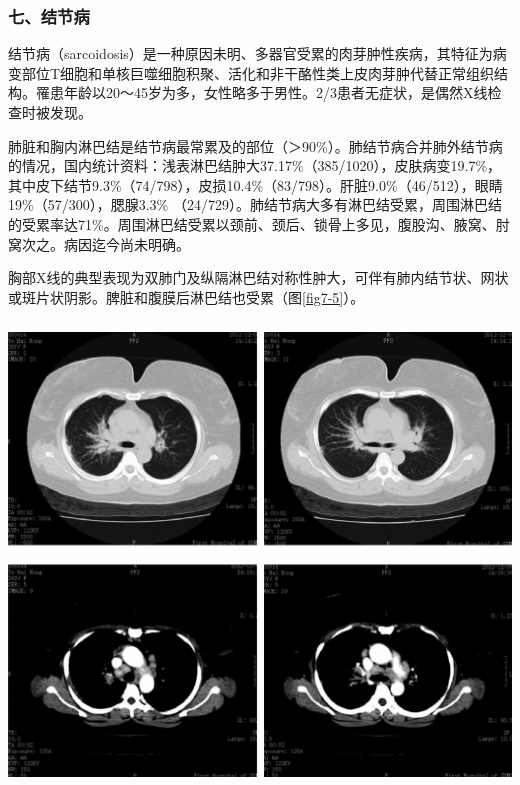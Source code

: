 \subsubsection{七、结节病}

结节病（sarcoidosis）是一种原因未明、多器官受累的肉芽肿性疾病，其特征为病变部位T细胞和单核巨噬细胞积聚、活化和非干酪性类上皮肉芽肿代替正常组织结构。罹患年龄以20～45岁为多，女性略多于男性。2/3患者无症状，是偶然X线检查时被发现。

肺脏和胸内淋巴结是结节病最常累及的部位（＞90\%）。肺结节病合并肺外结节病的情况，国内统计资料：浅表淋巴结肿大37.17\%（385/1020），皮肤病变19.7\%，其中皮下结节9.3\%（74/798），皮损10.4\%（83/798）。肝脏9.0\%（46/512），眼睛19\%（57/300），腮腺3.3\%
（24/729）。肺结节病大多有淋巴结受累，周围淋巴结的受累率达71\%。周围淋巴结受累以颈前、颈后、锁骨上多见，腹股沟、腋窝、肘窝次之。病因迄今尚未明确。

胸部X线的典型表现为双肺门及纵隔淋巴结对称性肿大，可伴有肺内结节状、网状或斑片状阴影。脾脏和腹膜后淋巴结也受累（图\ref{fig7-5}）。

\includegraphics[width=5.51042in,height=4.86458in]{./images/Image00057.jpg}

